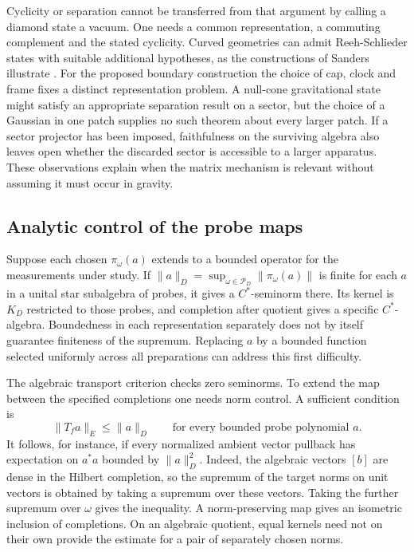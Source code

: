\documentclass[11pt,letterpaper]{article}
\newcommand{\Probes}{\mathcal P}
\begin{document}
Cyclicity or separation cannot be transferred from that argument by calling a diamond state a vacuum. One needs a common representation, a commuting complement and the stated cyclicity. Curved geometries can admit Reeh-Schlieder states with suitable additional hypotheses, as the constructions of Sanders illustrate \cite{sanders}. For the proposed boundary construction the choice of cap, clock and frame fixes a distinct representation problem. A null-cone gravitational state might satisfy an appropriate separation result on a sector, but the choice of a Gaussian in one patch supplies no such theorem about every larger patch. If a sector projector has been imposed, faithfulness on the surviving algebra also leaves open whether the discarded sector is accessible to a larger apparatus. These observations explain when the matrix mechanism is relevant without assuming it must occur in gravity.

\subsection{Analytic control of the probe maps}

Suppose each chosen $\pi_\omega(a)$ extends to a bounded operator for the measurements under study. If $\|a\|_D=\sup_{\omega\in\Probes_D}\|\pi_\omega(a)\|$ is finite for each $a$ in a unital star subalgebra of probes, it gives a $C^*$-seminorm there. Its kernel is $K_D$ restricted to those probes, and completion after quotient gives a specific $C^*$-algebra. Boundedness in each representation separately does not by itself guarantee finiteness of the supremum. Replacing $a$ by a bounded function selected uniformly across all preparations can address this first difficulty.

The algebraic transport criterion checks zero seminorms. To extend the map between the specified completions one needs norm control. A sufficient condition is
\[
 \|T_f a\|_E\le\|a\|_D \qquad\text{for every bounded probe polynomial }a .
\]
It follows, for instance, if every normalized ambient vector pullback has expectation on $a^*a$ bounded by $\|a\|_D^2$. Indeed, the algebraic vectors $[b]$ are dense in the Hilbert completion, so the supremum of the target norms on unit vectors is obtained by taking a supremum over these vectors. Taking the further supremum over $\omega$ gives the inequality. A norm-preserving map gives an isometric inclusion of completions. On an algebraic quotient, equal kernels need not on their own provide the estimate for a pair of separately chosen norms.
\end{document}
